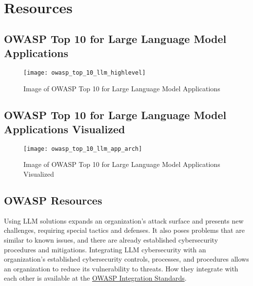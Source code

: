 

\headerimage
\chapter{Resources}

\section{OWASP Top 10 for Large Language Model Applications}

\begin{figure}[ht]
  \centering
  \texttt{[image: owasp\_top\_10\_llm\_highlevel]}
  \caption{Image of OWASP Top 10 for Large Language Model Applications}
  \label{fig:owasp-top-10-llm-highlevel}
\end{figure}

\clearpage
\section{OWASP Top 10 for Large Language Model Applications Visualized}

\begin{figure}[ht]
  \centering
  \texttt{[image: owasp\_top\_10\_llm\_app\_arch]}
  \caption{Image of OWASP Top 10 for Large Language Model Applications Visualized}
  \label{fig:owasp-top-10-llm-visualized}
\end{figure}

\clearpage
\section{OWASP Resources}

Using LLM solutions expands an organization's attack surface and presents new
challenges, requiring special tactics and defenses. It also poses problems that
are similar to known issues, and there are already established cybersecurity
procedures and mitigations. Integrating LLM cybersecurity with an organization's
established cybersecurity controls, processes, and procedures allows an
organization to reduce its vulnerability to threats. How they integrate with
each other is available at the
\href{https://owasp.org/www-project-integration-standards/}{OWASP Integration Standards}.

